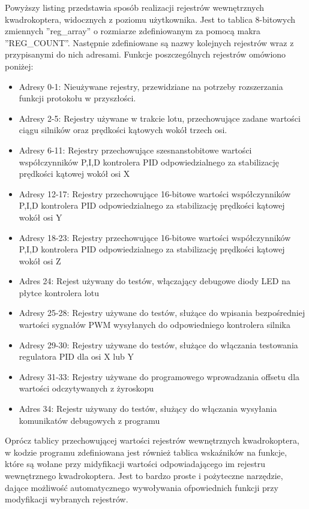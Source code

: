 Powyższy listing przedstawia sposób realizacji rejestrów wewnętrznych kwadrokoptera, widocznych z poziomu użytkownika. Jest to tablica 8-bitowych zmiennych ''reg\_array'' o rozmiarze zdefiniowanym za pomocą makra ''REG\_COUNT''. Następnie zdefiniowane są nazwy kolejnych rejestrów wraz z przypisanymi do nich adresami. Funkcje poszczególnych rejestrów omówiono poniżej:
\begin{itemize}
	\item Adresy 0-1: Nieużywane rejestry, przewidziane na potrzeby rozszerzania funkcji protokołu w przyszłości.
	\item Adresy 2-5: Rejestry używane w trakcie lotu, przechowujące zadane wartości ciągu silników oraz prędkości kątowych wokół trzech osi.
	\item Adresy 6-11: Rejestry przechowujące szesnanstobitowe wartości współczynników P,I,D kontrolera PID odpowiedzialnego za stabilizację prędkości kątowej wokół osi X
	\item Adresy 12-17: Rejestry przechowujące 16-bitowe wartości współczynników P,I,D kontrolera PID odpowiedzialnego za stabilizację prędkości kątowej wokół osi Y
	\item Adresy 18-23: Rejestry przechowujące 16-bitowe wartości współczynników P,I,D kontrolera PID odpowiedzialnego za stabilizację prędkości kątowej wokół osi Z
	\item Adres 24: Rejest używany do testów, włączający debugowe diody LED na płytce kontrolera lotu
	\item Adresy 25-28: Rejestry używane do testów, służące do wpisania bezpośredniej wartości sygnałów PWM wysyłanych do odpowiedniego kontrolera silnika
	\item Adresy 29-30: Rejestry używane do testów, służące do włączania testowania regulatora PID dla osi X lub Y
	\item Adresy 31-33: Rejestry używane do programowego wprowadzania offsetu dla wartości odczytywanych z żyroskopu
	\item Adres 34: Rejestr używany do testów, służący do włączania wysyłania komunikatów debugowych z programu 
\end{itemize}

Oprócz tablicy przechowującej wartości rejestrów wewnętrznych kwadrokoptera, w kodzie programu zdefiniowana jest również tablica wskaźników na funkcje, które są wołane przy midyfikacji wartości odpowiadającego im rejestru wewnętrznego kwadrokoptera. Jest to bardzo proste i pożyteczne narzędzie, dające możliwość automatycznego wywoływania ofpowiednich funkcji przy modyfikacji wybranych rejestrów.

